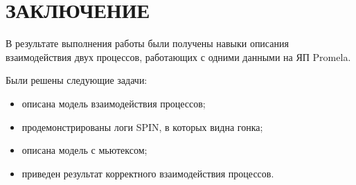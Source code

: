 \section*{ЗАКЛЮЧЕНИЕ}

В результате выполнения работы были получены навыки описания взаимодействия двух процессов, работающих с одними данными на ЯП Promela.

Были решены следующие задачи:
\begin{itemize}
	\item описана модель взаимодействия процессов;
	\item продемонстрированы логи SPIN, в которых видна гонка;
	\item описана модель с мьютексом;
	\item приведен результат корректного взаимодействия процессов.
\end{itemize}

\pagebreak
